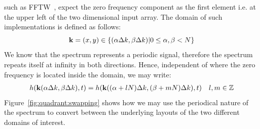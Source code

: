 such as FFTW~\citep{FFTW05}, expect the zero frequency component as the first element
i.e. at the upper left of the two dimensional input array.
The \wavevector domain of such implementations is defined as follows:
\begin{equation*}
\mathbf{k} = (x,y)\in\{(\alpha\Delta k,\beta\Delta k)|
0\leq\alpha,\beta<N\}
\end{equation*}
%
We know that the spectrum represents a periodic signal, therefore the spectrum
repeats itself at infinity in both directions. Hence, independent of where the
zero frequency is located inside the \wavevector domain, we may write:
%
\begin{align*}
 h(\mathbf{k}(\alpha\Delta k,\beta\Delta k),t) = h(\mathbf{k}((\alpha + lN)\Delta k, (\beta +mN)\Delta k),t) && l,m \in \mathbb{Z}
\end{align*}
%
Figure~\ref{fig:quadrant:swapping} shows how we may use the periodical nature
of the spectrum to convert between the underlying layouts of the two different
\wavevector domains of interest.


